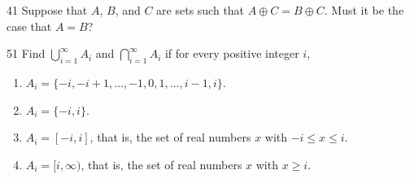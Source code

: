 \documentclass[11pt]{article}
\begin{document}
\begin{exercise}{41}
    Suppose that $A$, $B$, and $C$ are sets such that
    $A \oplus C = B \oplus C$. Must it be the case that $A = B$?
\end{exercise}

\begin{exercise}{51}
    Find $\bigcup_{i=1}^{\infty} A_i$ and $\bigcap_{i=1}^{\infty} A_i$ if
    for every positive integer $i$,
    \begin{enumerate}[label=(\alph*)]
        \item $A_i = \{-i, -i+1, \dots, -1, 0, 1, \dots, i-1, i\}$.
        \item $A_i = \{-i, i\}$.
        \item $A_i = [-i, i]$, that is, the set of real numbers $x$ with
        $-i \leq x \leq i$.
        \item $A_i = [i, \infty)$, that is, the set of real numbers $x$
        with $x \geq i$.
    \end{enumerate}
\end{exercise}
\end{document}

